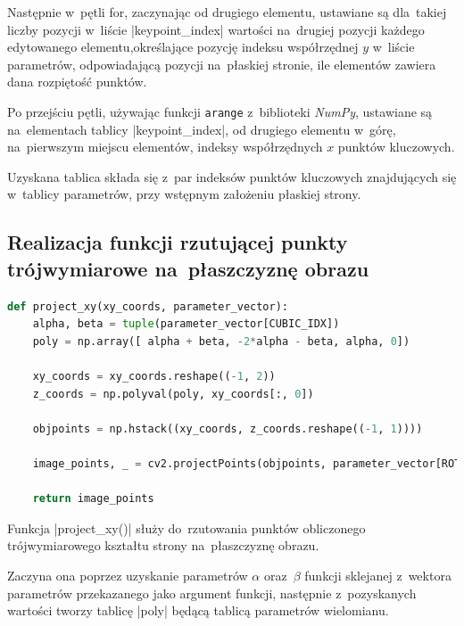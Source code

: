 Następnie w~pętli for, zaczynając od drugiego elementu, ustawiane są dla~takiej liczby \linebreak pozycji w~liście \pyth|keypoint_index| wartości na~drugiej pozycji każdego edytowanego elementu,\linebreak określające pozycję indeksu współrzędnej $y$ w~liście parametrów, odpowiadającą pozycji na~płaskiej stronie, ile elementów zawiera dana rozpiętość punktów.

Po przejściu pętli, używając funkcji \lstinline|arange| z~biblioteki \textit{NumPy}, ustawiane są na~elementach tablicy \pyth|keypoint_index|, od drugiego elementu w~górę, na~pierwszym miejscu elementów, indeksy współrzędnych $x$ punktów kluczowych.

Uzyskana tablica składa się z~par indeksów punktów kluczowych znajdujących się w~tablicy \linebreak parametrów, przy wstępnym założeniu płaskiej strony.

\newpage

\subsection{Realizacja funkcji rzutującej punkty trójwymiarowe na~płaszczyznę obrazu}

\begin{lstlisting}[caption={\pyth|project_xy()| - funkcja rzutująca punkty obliczonego trójwymiarowego kształtu strony na~płaszczyznę obrazu.}, label={project-xy}, language=Python]
def project_xy(xy_coords, parameter_vector):	
	alpha, beta = tuple(parameter_vector[CUBIC_IDX])
	poly = np.array([ alpha + beta, -2*alpha - beta, alpha, 0])
	
	xy_coords = xy_coords.reshape((-1, 2))
	z_coords = np.polyval(poly, xy_coords[:, 0])
	
	objpoints = np.hstack((xy_coords, z_coords.reshape((-1, 1))))
	
	image_points, _ = cv2.projectPoints(objpoints, parameter_vector[ROTATION_VECTOR_IDX], parameter_vector[TRANSLATION_VECTOR_IDX], CAMERA_MATRIX, np.zeros(5))
	
	return image_points
\end{lstlisting}

Funkcja \pyth|project_xy()| służy do~rzutowania punktów obliczonego trójwymiarowego kształtu strony na~płaszczyznę obrazu.

Zaczyna ona poprzez uzyskanie parametrów $\alpha$ oraz~$\beta$ funkcji sklejanej z~wektora parametrów przekazanego jako argument funkcji, następnie z~pozyskanych wartości tworzy tablicę \pyth|poly| będącą tablicą parametrów wielomianu.

